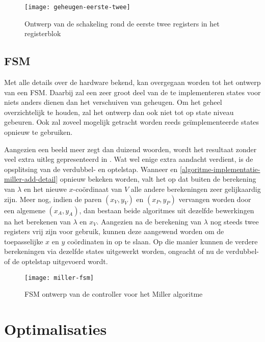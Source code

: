 \begin{figure}[h]
	\centering
		\texttt{[image: geheugen-eerste-twee]}
		\caption{Ontwerp van de schakeling rond de eerste twee registers in het registerblok\label{figuur-implementatie-geheugen-eerste-twee}}
\end{figure}

\subsection{FSM}

Met alle details over de hardware bekend, kan overgegaan worden tot het ontwerp van een FSM. Daarbij zal een zeer groot deel van de te implementeren states voor niets anders dienen dan het verschuiven van geheugen. Om het geheel overzichtelijk te houden, zal het ontwerp dan ook niet tot op state niveau gebeuren. Ook zal zoveel mogelijk getracht worden reeds ge\"implementeerde states opnieuw te gebruiken.

Aangezien een beeld meer zegt dan duizend woorden, wordt het resultaat zonder veel extra uitleg gepresenteerd in . Wat wel enige extra aandacht verdient, is de opsplitsing van de verdubbel- en optelstap. Wanneer  en \ref{algoritme-implementatie-miller-add-detail} opnieuw bekeken worden, valt het op dat buiten de berekening van $\lambda$ en het nieuwe $x$-co\"ordinaat van $V$ alle andere berekeningen zeer gelijkaardig zijn. Meer nog, indien de paren $(x_V, y_V)$ en $(x_P, y_P)$ vervangen worden door een algemene $(x_A, y_A)$, dan bestaan beide algoritmes uit dezelfde bewerkingen na het berekenen van $\lambda$ en $x_V$. Aangezien na de berekening van $\lambda$ nog steeds twee registers vrij zijn voor gebruik, kunnen deze aangewend worden om de toepasselijke $x$ en $y$ co\"ordinaten in op te slaan. Op die manier kunnen de verdere berekeningen via dezelfde states uitgewerkt worden, ongeacht of nu de verdubbel- of de optelstap uitgevoerd wordt.

\begin{figure}[h]
	\centering
		\texttt{[image: miller-fsm]}
		\caption{FSM ontwerp van de controller voor het Miller algoritme\label{figuur-miller-fsm}}
\end{figure}

\section{Optimalisaties\label{sectie-implementatie-optimalisaties}}

